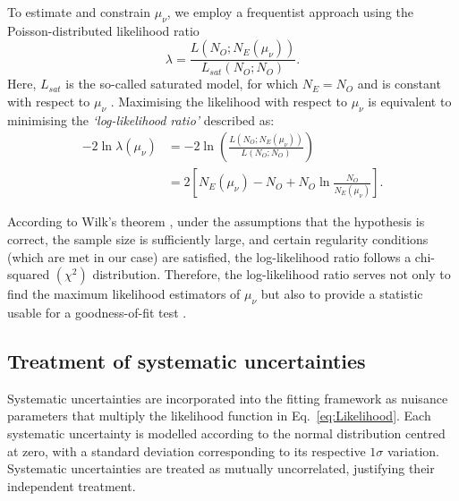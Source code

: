 To estimate and constrain $\mu_\nu$, we employ a frequentist approach using the Poisson-distributed likelihood ratio \cite{ExtendedMaximumLikelihood1990.pdf}
\begin{equation}
\lambda=\frac{L\left(N_O;N_E\left(\mu_\nu\right)\right)}{L_{sat}\left(N_O;N_O\right)}.
\end{equation}
Here, $L_{sat}$ is the so-called saturated model, for which $N_E=N_O$ and is constant with respect to $\mu_\nu$ \cite{PDG.pdf}. Maximising the likelihood with respect to $\mu_\nu$ is equivalent to minimising the \textit{`log-likelihood ratio'} described as:
\begin{align}\label{eq:LogLikelihoodStatsOnly}
-2\ln\lambda\left(\mu_\nu\right)&=
-2\ln\left(\frac{L\left(N_O;N_E\left(\mu_\nu\right)\right)}{L\left(N_O;N_O\right)}\right)\\
&=2\left[N_E\left(\mu_\nu\right)-N_O+N_O\ln\frac{N_O}{N_E\left(\mu_\nu\right)}\right].
\end{align}

According to Wilk's theorem \cite{WilksTheorem1938.pdf}, under the assumptions that the hypothesis is correct, the sample size is sufficiently large, and certain regularity conditions (which are met in our case) are satisfied, the log-likelihood ratio follows a chi-squared $\left(\chi^2\right)$ distribution. Therefore, the log-likelihood ratio serves not only to find the maximum likelihood estimators of $\mu_\nu$ but also to provide a statistic usable for a goodness-of-fit test \cite{PDG.pdf}.


\subsection{Treatment of systematic uncertainties}
Systematic uncertainties are incorporated into the fitting framework as nuisance parameters that multiply the likelihood function in Eq.~\ref{eq:Likelihood}. Each systematic uncertainty is modelled according to the normal distribution centred at zero, with a standard deviation corresponding to its respective $1\sigma$ variation. Systematic uncertainties are treated as mutually uncorrelated, justifying their independent treatment.

